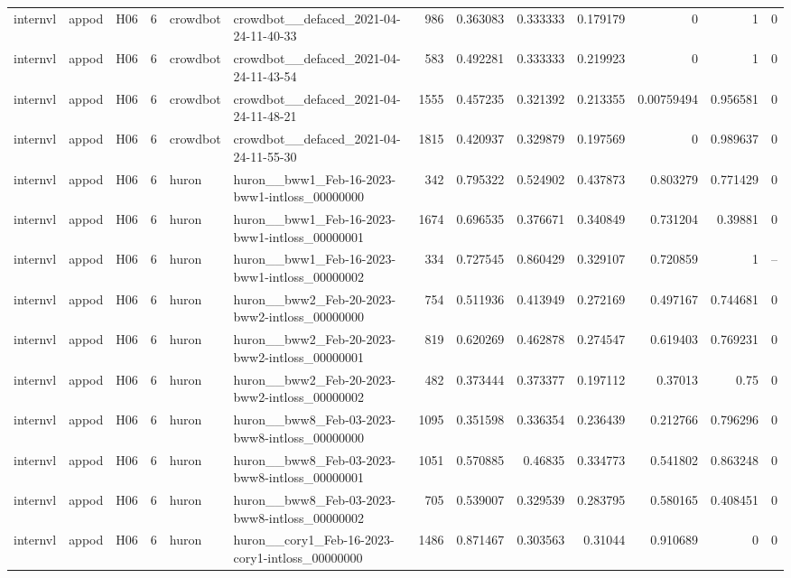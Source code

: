 \begin{longtable}{lllrllrrrrrrr}
internvl & appod & H06 & 6 & crowdbot & crowdbot\_\_defaced\_2021-04-24-11-40-33 & 986 & 0.363083 & 0.333333 & 0.179179 & 0 & 1 & 0 \\
internvl & appod & H06 & 6 & crowdbot & crowdbot\_\_defaced\_2021-04-24-11-43-54 & 583 & 0.492281 & 0.333333 & 0.219923 & 0 & 1 & 0 \\
internvl & appod & H06 & 6 & crowdbot & crowdbot\_\_defaced\_2021-04-24-11-48-21 & 1555 & 0.457235 & 0.321392 & 0.213355 & 0.00759494 & 0.956581 & 0 \\
internvl & appod & H06 & 6 & crowdbot & crowdbot\_\_defaced\_2021-04-24-11-55-30 & 1815 & 0.420937 & 0.329879 & 0.197569 & 0 & 0.989637 & 0 \\
internvl & appod & H06 & 6 & huron & huron\_\_bww1\_Feb-16-2023-bww1-intloss\_00000000 & 342 & 0.795322 & 0.524902 & 0.437873 & 0.803279 & 0.771429 & 0 \\
internvl & appod & H06 & 6 & huron & huron\_\_bww1\_Feb-16-2023-bww1-intloss\_00000001 & 1674 & 0.696535 & 0.376671 & 0.340849 & 0.731204 & 0.39881 & 0 \\
internvl & appod & H06 & 6 & huron & huron\_\_bww1\_Feb-16-2023-bww1-intloss\_00000002 & 334 & 0.727545 & 0.860429 & 0.329107 & 0.720859 & 1 & -- \\
internvl & appod & H06 & 6 & huron & huron\_\_bww2\_Feb-20-2023-bww2-intloss\_00000000 & 754 & 0.511936 & 0.413949 & 0.272169 & 0.497167 & 0.744681 & 0 \\
internvl & appod & H06 & 6 & huron & huron\_\_bww2\_Feb-20-2023-bww2-intloss\_00000001 & 819 & 0.620269 & 0.462878 & 0.274547 & 0.619403 & 0.769231 & 0 \\
internvl & appod & H06 & 6 & huron & huron\_\_bww2\_Feb-20-2023-bww2-intloss\_00000002 & 482 & 0.373444 & 0.373377 & 0.197112 & 0.37013 & 0.75 & 0 \\
internvl & appod & H06 & 6 & huron & huron\_\_bww8\_Feb-03-2023-bww8-intloss\_00000000 & 1095 & 0.351598 & 0.336354 & 0.236439 & 0.212766 & 0.796296 & 0 \\
internvl & appod & H06 & 6 & huron & huron\_\_bww8\_Feb-03-2023-bww8-intloss\_00000001 & 1051 & 0.570885 & 0.46835 & 0.334773 & 0.541802 & 0.863248 & 0 \\
internvl & appod & H06 & 6 & huron & huron\_\_bww8\_Feb-03-2023-bww8-intloss\_00000002 & 705 & 0.539007 & 0.329539 & 0.283795 & 0.580165 & 0.408451 & 0 \\
internvl & appod & H06 & 6 & huron & huron\_\_cory1\_Feb-16-2023-cory1-intloss\_00000000 & 1486 & 0.871467 & 0.303563 & 0.31044 & 0.910689 & 0 & 0 \\

\end{longtable}
